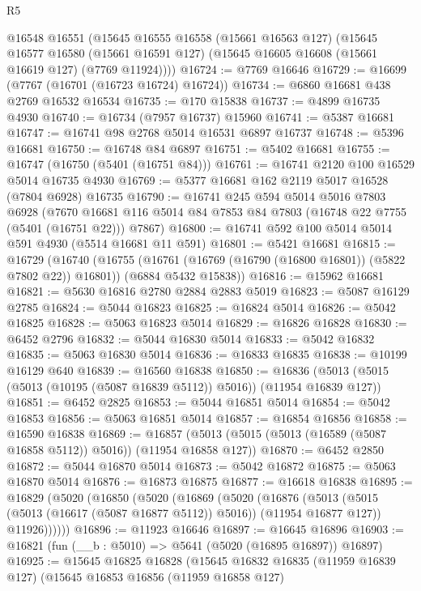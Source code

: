 \begin{lexlean}{R5}
\begin{coremodule}
    @16548
    @16551
    (@15645
      @16555
      @16558
      (@15661 @16563 @127)
      (@15645
        @16577
        @16580
        (@15661 @16591 @127)
        (@15645 @16605 @16608 (@15661 @16619 @127) (@7769 @11924))))
@16724 := @7769 @16646
@16729 := @16699 (@7767 (@16701 (@16723 @16724) @16724))
@16734 := @6860 @16681 @438 @2769 @16532 @16534
@16735 := @170 @15838
@16737 := @4899 @16735 @4930
@16740 := @16734 (@7957 @16737) @15960
@16741 := @5387 @16681
@16747 := @16741 @98 @2768 @5014 @16531 @6897 @16737
@16748 := @5396 @16681
@16750 := @16748 @84 @6897
@16751 := @5402 @16681
@16755 := @16747 (@16750 (@5401 (@16751 @84)))
@16761 := @16741 @2120 @100 @16529 @5014 @16735 @4930
@16769 := @5377 @16681 @162 @2119 @5017 @16528 (@7804 @6928) @16735
@16790 := @16741
    @245
    @594
    @5014
    @5016
    @7803
    @6928
    (@7670 @16681 @116 @5014 @84 @7853 @84 @7803 (@16748 @22 @7755 (@5401 (@16751 @22))) @7867)
@16800 := @16741 @592 @100 @5014 @5014 @591 @4930 (@5514 @16681 @11 @591)
@16801 := @5421 @16681
@16815 := @16729
    (@16740
      (@16755 (@16761 (@16769 (@16790 (@16800 @16801)) (@5822 @7802 @22)) @16801))
      (@6884 @5432 @15838))
@16816 := @15962 @16681
@16821 := @5630 @16816 @2780 @2884 @2883 @5019
@16823 := @5087 @16129 @2785
@16824 := @5044 @16823
@16825 := @16824 @5014
@16826 := @5042 @16825
@16828 := @5063 @16823 @5014
@16829 := @16826 @16828
@16830 := @6452 @2796
@16832 := @5044 @16830 @5014
@16833 := @5042 @16832
@16835 := @5063 @16830 @5014
@16836 := @16833 @16835
@16838 := @10199 @16129 @640
@16839 := @16560 @16838
@16850 := @16836 (@5013 (@5015 (@5013 (@10195 (@5087 @16839 @5112)) @5016)) (@11954 @16839 @127))
@16851 := @6452 @2825
@16853 := @5044 @16851 @5014
@16854 := @5042 @16853
@16856 := @5063 @16851 @5014
@16857 := @16854 @16856
@16858 := @16590 @16838
@16869 := @16857 (@5013 (@5015 (@5013 (@16589 (@5087 @16858 @5112)) @5016)) (@11954 @16858 @127))
@16870 := @6452 @2850
@16872 := @5044 @16870 @5014
@16873 := @5042 @16872
@16875 := @5063 @16870 @5014
@16876 := @16873 @16875
@16877 := @16618 @16838
@16895 := @16829
    (@5020
      (@16850
        (@5020
          (@16869
            (@5020
              (@16876
                (@5013 (@5015 (@5013 (@16617 (@5087 @16877 @5112)) @5016)) (@11954 @16877 @127))
                @11926))))))
@16896 := @11923 @16646
@16897 := @16645 @16896
@16903 := @16821 (fun (__b : @5010) => @5641 (@5020 (@16895 @16897)) @16897)
@16925 := @15645
    @16825
    @16828
    (@15645
      @16832
      @16835
      (@11959 @16839 @127)
      (@15645
        @16853
        @16856
        (@11959 @16858 @127)

\end{coremodule}
\end{lexlean}
